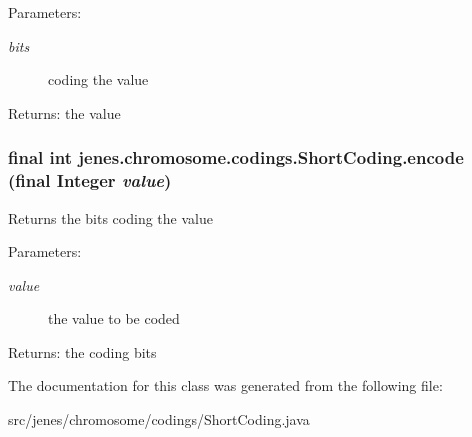 \begin{Desc}
\item[Parameters:]
\begin{description}
\item[{\em bits}]coding the value \end{description}
\end{Desc}
\begin{Desc}
\item[Returns:]the value \end{Desc}
\hypertarget{classjenes_1_1chromosome_1_1codings_1_1_short_coding_140298d12b6d6a291b5849b9cc5b7400}{
\subsubsection[encode]{\setlength{\rightskip}{0pt plus 5cm}final int jenes.chromosome.codings.ShortCoding.encode (final Integer {\em value})}}
\label{classjenes_1_1chromosome_1_1codings_1_1_short_coding_140298d12b6d6a291b5849b9cc5b7400}


Returns the bits coding the value

\begin{Desc}
\item[Parameters:]
\begin{description}
\item[{\em value}]the value to be coded \end{description}
\end{Desc}
\begin{Desc}
\item[Returns:]the coding bits \end{Desc}


The documentation for this class was generated from the following file:\begin{CompactItemize}
\item 
src/jenes/chromosome/codings/ShortCoding.java\end{CompactItemize}
